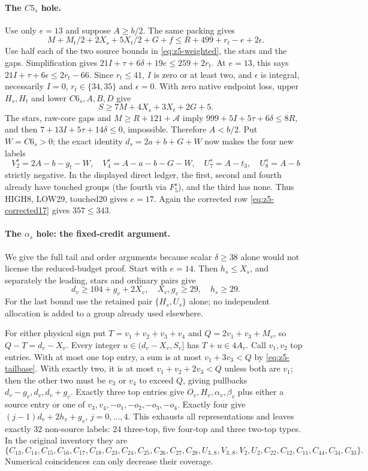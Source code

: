 \documentclass[11pt,letterpaper]{article}
\theoremstyle{definition}\newtheorem{definition}[theorem]{Definition}
\begin{document}
\paragraph{The $C5_s$ hole.}
Use only $e=13$ and suppose $A\ge b/2$. The same packing gives
\[
 M+M_t/2+2X_s+5X_t/2+G+f\le R+499+r_t-e+2\epsilon.
\]
Use half each of the two source bounds in \eqref{eq:z5-weighted},
the stars and the gaps. Simplification gives
$21I+\tau+6\delta+19e\le259+2r_t$.
At $e=13$, this says
$21I+\tau+6\epsilon\le2r_t-66$.
Since $r_t\le41$, $I$ is zero or at least two, and $\epsilon$ is
integral, necessarily $I=0$, $r_t\in\{34,35\}$ and $\epsilon=0$.
With zero native endpoint loss, upper $H_s,H_t$ and lower
$C6_s,A,B,D$ give
\[
 S\ge7M+4X_s+3X_t+2G+5.
\]
The stars, raw-core gaps and $M\ge R+121+\mathcal A$ imply
$999+5I+5\tau+6\delta\le8R$, and then
$7+13I+5\tau+14\delta\le0$, impossible.
Therefore $A<b/2$. Put $W=C6_s>0$; the exact identity
$d_s=2a+b+G+W$ now makes the four new labels
\[
 V_2^s=2A-b-g_t-W,\quad V_4^s=A-a-b-G-W,\quad
 U_7^s=A-t_3,\quad U_8^s=A-b
\]
strictly negative. In the displayed direct ledger, the first, second and
fourth already have touched groups (the fourth via $F_5^s$), and the
third has none. Thus HIGH8, LOW29, touched20 gives $e=17$.
Again the corrected row \eqref{eq:z5-corrected17} gives $357\le343$.

\paragraph{The $\alpha_s$ hole: the fixed-credit argument.}
We give the full tail and order arguments because scalar $\delta\ge38$
alone would not license the reduced-budget proof. Start with $e=14$.
Then $h_s\le X_s$, and separately the leading, stars and ordinary pairs
give
\begin{equation}\label{eq:z5-tailbase}
 d_v\ge104+g_v+2X_v,\quad X_v,g_v\ge29,\quad h_s\ge29.
\end{equation}
For the last bound use the retained pair $\{H_s,U_s\}$ alone; no
independent allocation is added to a group already used elsewhere.

For either physical sign put $T=v_1+v_2+v_3+v_4$ and
$Q=2v_1+v_3+M_v$, so $Q-T=d_v-X_v$.
Every integer $u\in(d_v-X_v,S_v]$ has $T+u\in4A_v$.
Call $v_1,v_2$ top entries. With at most one top entry, a sum is at
most $v_1+3v_3<Q$ by \eqref{eq:z5-tailbase}. With exactly two,
it is at most $v_1+v_2+2v_3<Q$ unless both are $v_1$; then the
other two must be $v_3$ or $v_4$ to exceed $Q$, giving pullbacks
$d_v-g_v,d_v,d_v+g_v$. Exactly three top entries give
$O_v,H_v,\alpha_v,\beta_v$ plus either a source entry or one of
$v_3,v_4,-o_1,-o_2,-o_3,-o_4$. Exactly four give
$(j-1)d_v+2h_v+g_v$, $j=0,\ldots,4$.
This exhausts all representations and leaves exactly 32 non-source
labels: 24 three-top, five four-top and three two-top types. In the
original inventory they are
\[
 \{C_{13},C_{14},C_{15},C_{16},C_{17},C_{18},
 C_{23},C_{24},C_{25},C_{26},C_{27},C_{28},
 U_{3..8},V_{3..8},V_2,U_2,C_{22},C_{12},C_{11},C_{44},C_{34},C_{33}\}.
\]
Numerical coincidences can only decrease their coverage.
\end{document}
